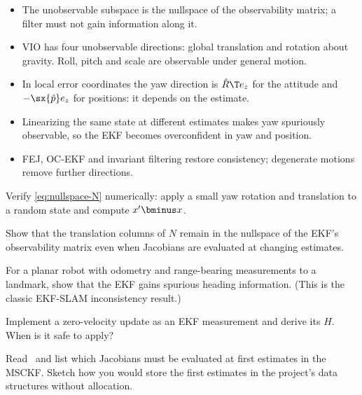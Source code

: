 \begin{takeaways}
\begin{itemize}
  \item The unobservable subspace is the nullspace of the observability matrix; a filter must not gain information along it.
  \item VIO has four unobservable directions: global translation and rotation about gravity. Roll, pitch and scale are observable
        under general motion.
  \item In local error coordinates the yaw direction is $\hat R\T e_z$ for the attitude and $-\sx{\hat p}e_z$ for positions: it depends on
        the estimate.
  \item Linearizing the same state at different estimates makes yaw spuriously observable, so the EKF becomes overconfident in yaw and
        position.
  \item FEJ, OC-EKF and invariant filtering restore consistency; degenerate motions remove further directions.
\end{itemize}
\end{takeaways}

\begin{exercises}
  \item Verify \eqref{eq:nullspace-N} numerically: apply a small yaw rotation and translation to a random state and compute
        $x'\bminus x$.
  \item Show that the translation columns of $N$ remain in the nullspace of the EKF's observability matrix even when Jacobians are
        evaluated at changing estimates.
  \item For a planar robot with odometry and range-bearing measurements to a landmark, show that the EKF gains spurious
        heading information. (This is the classic EKF-SLAM inconsistency result.)
  \item Implement a zero-velocity update as an EKF measurement and derive its $H$. When is it safe to apply?
  \item Read~\cite{li2013msckf2} and list which Jacobians must be evaluated at first estimates in the MSCKF. Sketch how you would store
        the first estimates in the project's data structures without allocation.
\end{exercises}
